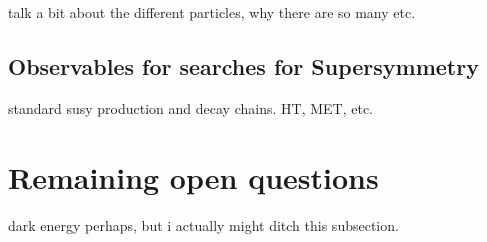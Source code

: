 talk a bit about the different particles, why there are so many etc.

\subsection{Observables for searches for Supersymmetry}
\label{sub:susy_observables}

standard susy production and decay chains. HT, MET, etc.

\section{Remaining open questions}
\label{sec:theory_remains}

dark energy perhaps, but i actually might ditch this subsection.
